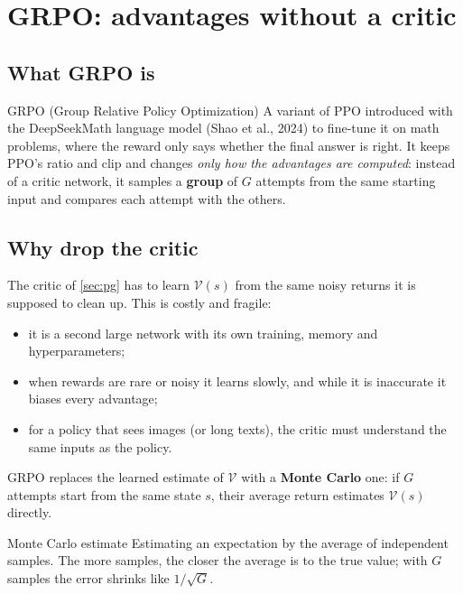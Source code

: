 \documentclass[11pt,a4paper]{article}
\newcommand{\Vf}{\mathcal{V}}
\begin{document}
\section{GRPO: advantages without a critic}\label{sec:grpo}

\subsection{What GRPO is}
\begin{newc}{GRPO (Group Relative Policy Optimization)}
A variant of PPO introduced with the DeepSeekMath language model (Shao et al., 2024) to fine-tune it on math problems, where the reward only says whether the final answer is right. It keeps PPO's ratio and clip and changes \emph{only how the advantages are computed}: instead of a critic network, it samples a \textbf{group} of $G$ attempts from the same starting input and compares each attempt with the others.
\end{newc}

\subsection{Why drop the critic}
The critic of \cref{sec:pg} has to learn $\Vf(s)$ from the same noisy returns it is supposed to clean up. This is costly and fragile:
\begin{itemize}
\item it is a second large network with its own training, memory and hyperparameters;
\item when rewards are rare or noisy it learns slowly, and while it is inaccurate it biases every advantage;
\item for a policy that sees images (or long texts), the critic must understand the same inputs as the policy.
\end{itemize}
GRPO replaces the learned estimate of $\Vf$ with a \textbf{Monte Carlo} one: if $G$ attempts start from the same state $s$, their average return estimates $\Vf(s)$ directly.

\begin{newc}{Monte Carlo estimate}
Estimating an expectation by the average of independent samples. The more samples, the closer the average is to the true value; with $G$ samples the error shrinks like $1/\sqrt G$.
\end{newc}
\end{document}
